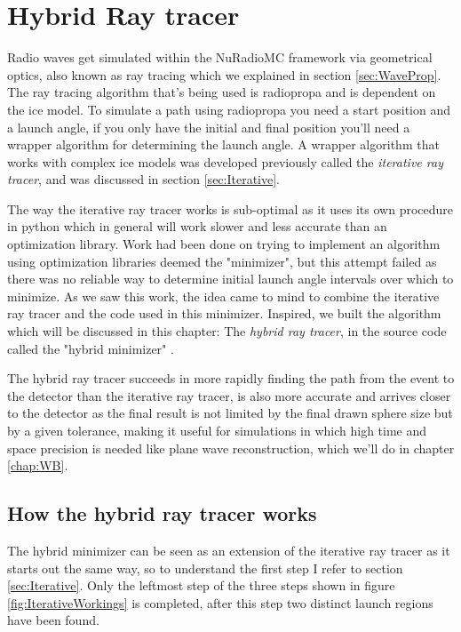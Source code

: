 \chapter{Hybrid Ray tracer}
\label{chapter:hybrid}
Radio waves get simulated within the NuRadioMC framework via geometrical
optics, also known as ray tracing which we explained in section \ref{sec:WaveProp}.
The ray tracing algorithm that's being used is radiopropa and is dependent on
the ice model. To simulate a path using radiopropa you need a start position 
and a launch angle, if you only have the initial and final position you'll need
a wrapper algorithm for determining the launch angle.  
A wrapper algorithm that works with complex ice models was developed previously
called the \textit{iterative ray tracer}\cite{2022icrc.confE1027O}, and was
discussed in section \ref{sec:Iterative}.

The way the iterative ray tracer works is sub-optimal as it uses its own
procedure in python which in general will work slower and less accurate than an
optimization library. Work had been done on trying to implement an algorithm
using optimization libraries deemed the "minimizer", but this attempt failed as
there was no reliable way to determine initial launch angle intervals over
which to minimize.  As we saw this work, the idea came to mind to combine the
iterative ray tracer and the code used in this minimizer. Inspired, we
built the algorithm which will be discussed in this chapter: The \textit{hybrid ray
tracer}, in the source code called the "hybrid minimizer" \cite{hybrid}. 

The hybrid ray tracer succeeds in more rapidly finding the path from the event
to the detector than the iterative ray tracer, is also more accurate and
arrives closer to the detector as the final result is not limited by the final
drawn sphere size but by a given tolerance, making it useful for simulations in
which high time and space precision is needed like plane wave reconstruction,
which we'll do in chapter \ref{chap:WB}.

\section{How the hybrid ray tracer works}
The hybrid minimizer can be seen as an extension of the iterative ray tracer as
it starts out the same way, so to understand the first step I refer to section 
\ref{sec:Iterative}. Only the leftmost step of the three steps shown in figure
\ref{fig:IterativeWorkings} is completed, after this step two distinct launch regions
have been found.

